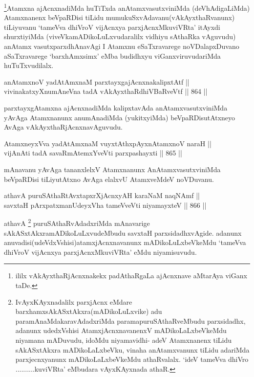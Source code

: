 \begin{artha}
\footnote{ililx vAkAyxthaRjAcnxnakekx padAthaRgaLa ajAcnxnave aMtarAya viGanx taDe.}Atamxna ajAcnxnadiMda huTiTxda anAtamxvasutxviniMda (deVhAdigaLiMda) Atamxnanenx beVpaRDisi tiLidu mumukuSxvAdavanu(vAkAyxthaRvanunx) tiLiyuvanu `tameVva dhiVroV vijAcnxya parxjAcnxMkuviVRta' itAyxdi shurxtiyiMda (viveVkamADikoLuLxvudaralilx vidhiyu sAthaRka vAguvudu) anAtamx vasutxparxdhAnavAgi I Atamxnu eSaTxravarege noVDalapxDuvano aSaTxravarege `barxhAmxsimx' eMba budidhxyu viGanxviruvudariMda huTuTxvudilalx.
\end{artha}


\begin{shl}
anAtamxnoV yadA\s \s tAmxnaM parxtayxgajAcnxnakalipxtAtf || \\
vivinakatxyXnumAneVna tadA vAkAyxthaRdhiVBaRveVtf \hfill || 864 ||  
\end{shl}

\begin{artha}
parxtayxgAtamxna ajAcnxnadiMda kalipxtavAda anAtamxvasutxviniMda yAvAga Atamxnanunx anumAnadiMda (yukitxyiMda) beVpaRDisutAtxneyo AvAga vAkAyxthaRjAcnxnavAguvudu.
\end{artha}


\begin{shl}
AtamxneyxVva yadA\s \s tAmxnaM vuyxtAthxpAyxnAtamxnoV naraH || \\
vijAnAti tadA savaRmAtemxYveVti parxpashayxti \hfill || 865 ||  
\end{shl}

\begin{artha}
mAnavanu yAvAga tananxlelxV Atamxnanunx AnAtamxvasutxviniMda beVpaRDisi tiLiyutAtxno AvAga elalxvU AtamxveMdeV noVDuvanu.
\end{artha}


\begin{shl}
athavA puruSAthaRtAvxtapxrXjAcnxyAH karaNaM naqNAmf || \\
savxtaH pArxpatxmanUdeyxVha tameVveVti niyamayxteV \hfill || 866 ||  
\end{shl}

\begin{artha}
athavA \footnote{IvAyxKAyxnadalilx parxjAcnx eMdare barxhamxsAkASxtAkxra(mADikoLuLxvike) adu paramAnaMdakaravAdadxriMda paramapuruSAthaRveMbudu parxsidadhx, adanunx udedxVshisi AtamxjAcnxnavanenxV mADikoLaLxbeVkeMdu niyamana mADuvudu, idoMdu niyamavidhi- adeV Atamxnanenx tiLidu sAkASxtAkxra mADikoLaLxbeVku, vinaha anAtamxvanunx tiLidu adariMda parxjecnxyanunx mADikoLaLxbeVkeMdu athaRvalalx. `ideV tameVva dhiVro ..........kuviVRta' eMbudara vAyxKAyxnada athaR.} puruSAthaRvAdadxriMda mAnavarige sAkASxtAkxramADikoLuLxvudeMbudu savxtaH parxsidadhxvAgide. adanunx anuvadisi(udeVdxVshisi)atamxjAcnxnavanunx mADikoLuLxbeVkeMdu `tameVva dhiVroV vijAcnxya parxjAcnxMkuviVRta' eMdu niyamisuvudu.
\end{artha}

